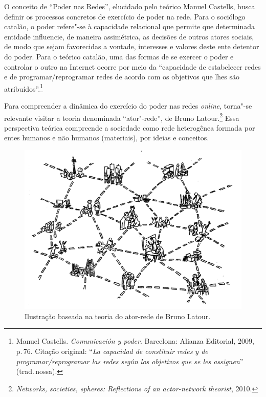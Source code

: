 O conceito de ``Poder nas Redes'', elucidado pelo teórico Manuel
Castells, busca definir os processos concretos de exercício de
poder na rede. Para o sociólogo catalão, o poder refere"-se à capacidade
relacional que permite que determinada entidade influencie, de maneira
assimétrica, as decisões de outros atores sociais, de modo que sejam
favorecidas a vontade, interesses e valores deste ente detentor do
poder. Para o teórico catalão, uma das formas de se exercer o poder e
controlar o outro na Internet ocorre por meio da ``capacidade de
estabelecer redes e de programar/reprogramar redes de acordo com os
objetivos que lhes são atribuídos''.\footnote{Manuel Castells. \emph{Comunicación y poder}. Barcelona: Alianza Editorial, 2009, p.\,76. Citação original: ``\emph{La capacidad de constituir redes y de programar/reprogramar las redes según los objetivos que se les
  assignen}'' (trad.\,nossa).}

Para compreender a dinâmica do exercício do poder nas redes \emph{online},
torna"-se relevante visitar a teoria denominada ``ator"-rede'', de Bruno
Latour.\footnote{\emph{Networks, societies, spheres: Reflections of an
actor-network theorist}, 2010.} Essa perspectiva teórica compreende a sociedade como rede
heterogênea formada por entes humanos e não humanos (materiais), por
ideias e conceitos.


\begin{figure}[!ht]
\includegraphics[width=\textwidth]{./imgs/grafico4.jpg}
\caption{\formular\footnotesize{Ilustração baseada na teoria do ator-rede de Bruno Latour.\protect\footnotemark}}
\end{figure}

